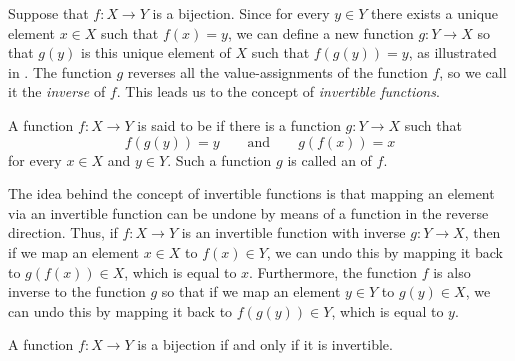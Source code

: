Suppose that $f:X\to Y$ is a bijection. Since for every $y\in Y$ there exists a unique element $x\in X$ such that $f(x)=y$, we can define a new function $g:Y\to X$ so that $g(y)$ is this unique element of $X$ such that $f(g(y))=y$, as illustrated in . The function $g$ reverses all the value-assignments of the function $f$, so we call it the \emph{inverse} of $f$. This leads us to the concept of \emph{invertible functions}.

\begin{definition}
  A function $f:X\to Y$ is said to be  if there is a function $g:Y\to X$ such that
  \begin{equation*}
    f(g(y))=y \qquad\text{and}\qquad g(f(x))=x
  \end{equation*}
  for every $x\in X$ and $y\in Y$. Such a function $g$ is called an  of $f$.
\end{definition}

The idea behind the concept of invertible functions is that mapping an element via an invertible function can be undone by means of a function in the reverse direction. Thus, if $f:X\to Y$ is an invertible function with inverse $g:Y\to X$, then if we map an element $x\in X$ to $f(x)\in Y$, we can undo this by mapping it back to $g(f(x))\in X$, which is equal to $x$. Furthermore, the function $f$ is also inverse to the function $g$ so that if we map an element $y\in Y$ to $g(y)\in X$, we can undo this by mapping it back to $f(g(y))\in Y$, which is equal to $y$.

\begin{theorem}\label{theorem:invertible-maps}
  A function $f:X\to Y$ is a bijection if and only if it is invertible.
\end{theorem}

